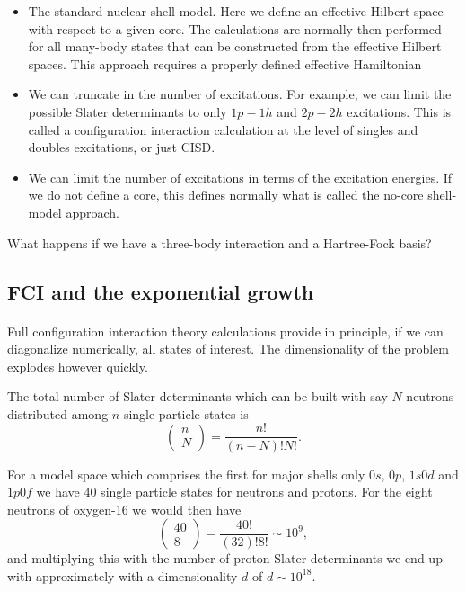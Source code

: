 \begin{itemize}
\item The standard nuclear shell-model. Here we define an effective Hilbert space with respect to a given core. The calculations are normally then performed for all many-body states that can be constructed from the effective Hilbert spaces. This approach requires a properly defined effective Hamiltonian

\item We can truncate in the number of excitations. For example, we can limit the possible Slater determinants to only $1p-1h$ and $2p-2h$ excitations. This is called a configuration interaction calculation at the level of singles and doubles excitations, or just CISD. 

\item We can limit the number of excitations in terms of the excitation energies. If we do not define a core, this defines normally what is called the no-core shell-model approach. 
\end{itemize}

\noindent
What happens if we have a three-body interaction and a Hartree-Fock basis?



\subsection*{FCI and the exponential growth}

\paragraph{}
Full configuration interaction theory calculations provide in principle, if we can diagonalize numerically, all states of interest. The dimensionality of the problem explodes however quickly.

The total number of Slater determinants which can be built with say $N$ neutrons distributed among $n$ single particle states is
\[
\left (\begin{array}{c} n \\ N\end{array} \right) =\frac{n!}{(n-N)!N!}. 
\]

For a model space which comprises the first for major shells only $0s$, $0p$, $1s0d$ and $1p0f$ we have $40$ single particle states for neutrons and protons.  For the eight neutrons of oxygen-16 we would then have
\[
\left (\begin{array}{c} 40 \\ 8\end{array} \right) =\frac{40!}{(32)!8!}\sim 10^{9}, 
\]
and multiplying this with the number of proton Slater determinants we end up with approximately with a dimensionality $d$ of $d\sim 10^{18}$.



